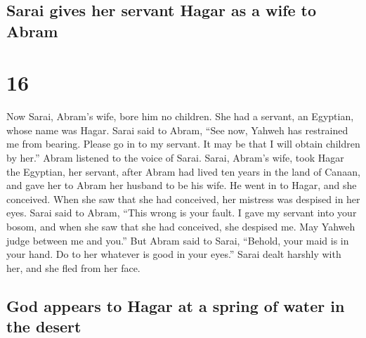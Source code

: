 \hypertarget{sarai-gives-her-servant-hagar-as-a-wife-to-abram}{%
\subsection{Sarai gives her servant Hagar as a wife to
Abram}\label{sarai-gives-her-servant-hagar-as-a-wife-to-abram}}

\hypertarget{section-15}{%
\section{16}\label{section-15}}

 Now Sarai, Abram's wife, bore him no children. She had a
servant, an Egyptian, whose name was Hagar.  Sarai said to
Abram, ``See now, Yahweh has restrained me from bearing. Please go in to
my servant. It may be that I will obtain children by her.'' Abram
listened to the voice of Sarai.  Sarai, Abram's wife, took
Hagar the Egyptian, her servant, after Abram had lived ten years in the
land of Canaan, and gave her to Abram her husband to be his wife.
 He went in to Hagar, and she conceived. When she saw that
she had conceived, her mistress was despised in her eyes. 
Sarai said to Abram, ``This wrong is your fault. I gave my servant into
your bosom, and when she saw that she had conceived, she despised me.
May Yahweh judge between me and you.''  But Abram said to
Sarai, ``Behold, your maid is in your hand. Do to her whatever is good
in your eyes.'' Sarai dealt harshly with her, and she fled from her
face.

\hypertarget{god-appears-to-hagar-at-a-spring-of-water-in-the-desert}{%
\subsection{God appears to Hagar at a spring of water in the
desert}\label{god-appears-to-hagar-at-a-spring-of-water-in-the-desert}}

